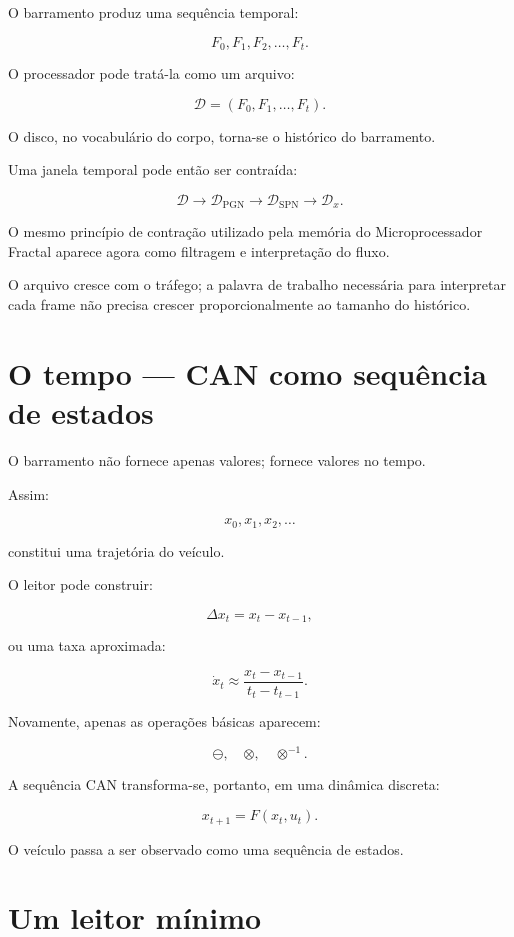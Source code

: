 \documentclass[11pt,a4paper]{article}
\begin{document}
O barramento produz uma sequência temporal:

\[
F_0,F_1,F_2,\ldots,F_t.
\]

O processador pode tratá-la como um arquivo:

\[
\mathcal{D}
=
(F_0,F_1,\ldots,F_t).
\]

O disco, no vocabulário do corpo, torna-se o histórico do barramento.

Uma janela temporal pode então ser contraída:

\[
\mathcal{D}
\rightarrow
\mathcal{D}_{\mathrm{PGN}}
\rightarrow
\mathcal{D}_{\mathrm{SPN}}
\rightarrow
\mathcal{D}_{x}.
\]

O mesmo princípio de contração utilizado pela memória do Microprocessador Fractal
aparece agora como filtragem e interpretação do fluxo.

O arquivo cresce com o tráfego; a palavra de trabalho necessária para interpretar
cada frame não precisa crescer proporcionalmente ao tamanho do histórico.


\section{O tempo --- CAN como sequência de estados}

O barramento não fornece apenas valores; fornece valores no tempo.

Assim:

\[
x_0,x_1,x_2,\ldots
\]

constitui uma trajetória do veículo.

O leitor pode construir:

\[
\Delta x_t=x_t-x_{t-1},
\]

ou uma taxa aproximada:

\[
\dot{x}_t
\approx
\frac{x_t-x_{t-1}}{t_t-t_{t-1}}.
\]

Novamente, apenas as operações básicas aparecem:

\[
\ominus,\quad \otimes,\quad \otimes^{-1}.
\]

A sequência CAN transforma-se, portanto, em uma dinâmica discreta:

\[
x_{t+1}=F(x_t,u_t).
\]

O veículo passa a ser observado como uma sequência de estados.


\section{Um leitor mínimo}
\end{document}

